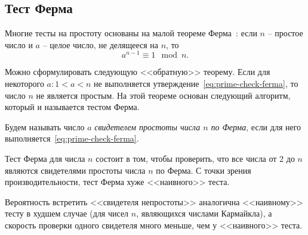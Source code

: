 \subsection{Тест Ферма}\label{section-prime-check-ferma}

Многие тесты на простоту основаны на малой теореме Ферма~\cite{Vinberg:2008}: если $n$ -- простое число и $a$ -- целое число, не делящееся на $n$, то
\begin{equation}\label{eq:prime-check-ferma}
    a^{n-1} \equiv 1 \mod n.
\end{equation}

Можно сформулировать следующую <<обратную>> теорему. Если для некоторого $a: 1 < a < n$ не выполняется утверждение~\ref{eq:prime-check-ferma}, то число $n$ не является простым. На этой теореме основан следующий алгоритм, который и называется тестом Ферма.

Будем называть число $a$ \emph{свидетелем простоты числа $n$ по Ферма}, если для него выполняется~\ref{eq:prime-check-ferma}.

Тест Ферма для числа $n$ состоит в том, чтобы проверить, что все числа от $2$ до $n$ являются свидетелями простоты числа $n$ по Ферма. С точки зрения производительности, тест Ферма хуже <<наивного>> теста.

Вероятность встретить <<свидетеля непростоты>> аналогична <<наивному>> тесту в худшем случае (для чисел $n$, являющихся числами Кармайкла), а скорость проверки одного свидетеля много меньше, чем у <<наивного>> теста.
